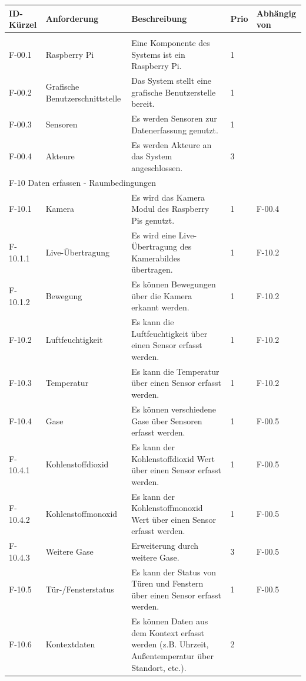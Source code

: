 \begin{tabularx}{\textwidth}{|l|X|X|l|l|}
    \toprule
    \textbf{ID-Kürzel} & \textbf{Anforderung} & \textbf{Beschreibung} & \textbf{Prio} & \textbf{Abhängig von} \\
    \hline
    \endhead
    \hline
    \caption{Anforderungen}
    \label{tab:anforderungen}
    \endfoot
    \multicolumn{5}{|l|}{F-00 Allgemein}\\
    \hline
    F-00.1 & Raspberry Pi & Eine Komponente des Systems ist ein Raspberry Pi. & 1 & \\
    F-00.2 & Grafische Benutzerschnittstelle & Das System stellt eine grafische Benutzerstelle bereit. & 1 & \\
    F-00.3 & Sensoren & Es werden Sensoren zur Datenerfassung genutzt. & 1 & \\
    F-00.4 & Akteure & Es werden Akteure an das System angeschlossen. & 3 & \\
    \hline
    \multicolumn{5}{|l|}{F-10 Daten erfassen - Raumbedingungen}\\
    \hline
    F-10.1   & Kamera & Es wird das Kamera Modul des Raspberry Pis genutzt. & 1 & F-00.4\\
    F-10.1.1 & Live-Übertragung & Es wird eine Live-Übertragung des Kamerabildes übertragen. & 1 & F-10.2 \\
    F-10.1.2 & Bewegung & Es können Bewegungen über die Kamera erkannt werden. & 1 & F-10.2 \\
    F-10.2 & Luftfeuchtigkeit & Es kann die Luftfeuchtigkeit über einen Sensor erfasst werden. & 1 & F-10.2 \\
    F-10.3 & Temperatur & Es kann die Temperatur über einen Sensor erfasst werden. & 1 & F-10.2 \\
    F-10.4 & Gase & Es können verschiedene Gase über Sensoren erfasst werden.  & 1 & F-00.5\\
    F-10.4.1 & Kohlenstoffdioxid & Es kann der Kohlenstoffdioxid Wert über einen Sensor erfasst werden. & 1 & F-00.5\\
    F-10.4.2 & Kohlenstoffmonoxid & Es kann der Kohlenstoffmonoxid Wert über einen Sensor erfasst werden. & 1 & F-00.5\\
    F-10.4.3 & Weitere Gase & Erweiterung durch weitere Gase. & 3 & F-00.5\\
    F-10.5 & Tür-/Fensterstatus & Es kann der Status von Türen und Fenstern über einen Sensor erfasst werden.  & 1 & F-00.5\\
    F-10.6 & Kontextdaten & Es können Daten aus dem Kontext erfasst werden (z.B. Uhrzeit, Außentemperatur über Standort, etc.). & 2 & \\  

\end{tabularx}

